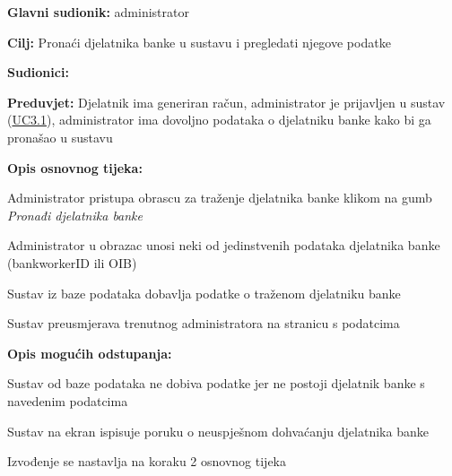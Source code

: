 					
					\noindent {}
					\begin{packed_item}  \label{UC4.2}
	
						\item \textbf{Glavni sudionik: }administrator
						\item  \textbf{Cilj:} Pronaći djelatnika banke u sustavu i pregledati njegove podatke
						\item  \textbf{Sudionici:} 
						\item  \textbf{Preduvjet:} Djelatnik ima generiran račun, administrator je prijavljen u sustav (\hyperref[UC3.1]{UC3.1}), administrator ima dovoljno podataka o djelatniku banke kako bi ga pronašao u sustavu
						\item  \textbf{Opis osnovnog tijeka:}
						
						\item[] \begin{packed_enum}
	                        \item Administrator pristupa obrascu za traženje djelatnika banke klikom na gumb \textit{Pronađi djelatnika banke}
	                        \item Administrator u obrazac unosi neki od jedinstvenih podataka djelatnika banke (bankworkerID ili OIB)
	                        \item Sustav iz baze podataka dobavlja podatke o traženom djelatniku banke
	                        \item Sustav preusmjerava trenutnog administratora na stranicu s podatcima 
						\end{packed_enum}
						
						\item  \textbf{Opis mogućih odstupanja:}
						\item[] \begin{packed_item}
	
							\item[3] Sustav od baze podataka ne dobiva podatke jer ne postoji djelatnik banke s navedenim podatcima
							\item[] \begin{packed_enum}
								\item Sustav na ekran ispisuje poruku o neuspješnom dohvaćanju djelatnika banke
								\item Izvođenje se nastavlja na koraku 2 osnovnog tijeka
							\end{packed_enum}
							
						\end{packed_item}
						
					\end{packed_item}
					
